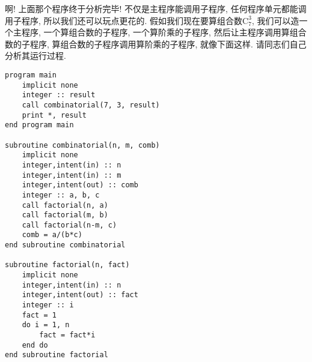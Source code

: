 啊! 上面那个程序终于分析完毕! 不仅是主程序能调用子程序, 任何程序单元都能调用子程序, 所以我们还可以玩点更花的. 假如我们现在要算组合数$\text{C}_7^3$, 我们可以造一个主程序, 一个算组合数的子程序, 一个算阶乘的子程序, 然后让主程序调用算组合数的子程序, 算组合数的子程序调用算阶乘的子程序, 就像下面这样. 请同志们自己分析其运行过程.\label{fact_comb}
\begin{lstlisting}
program main
    implicit none
    integer :: result
    call combinatorial(7, 3, result)
    print *, result
end program main

subroutine combinatorial(n, m, comb)
    implicit none
    integer,intent(in) :: n
    integer,intent(in) :: m
    integer,intent(out) :: comb
    integer :: a, b, c
    call factorial(n, a)
    call factorial(m, b)
    call factorial(n-m, c)
    comb = a/(b*c)
end subroutine combinatorial

subroutine factorial(n, fact)
    implicit none
    integer,intent(in) :: n
    integer,intent(out) :: fact
    integer :: i
    fact = 1
    do i = 1, n
        fact = fact*i
    end do
end subroutine factorial
\end{lstlisting}

